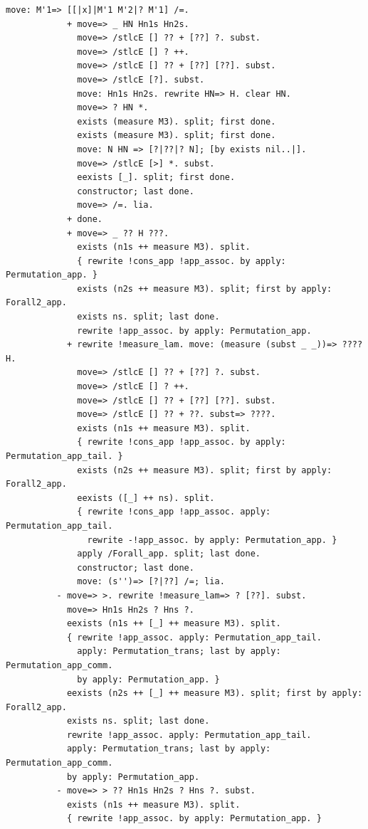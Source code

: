 \begin{lstlisting}[style=authorcoq]
            move: M'1=> [[|x]|M'1 M'2|? M'1] /=.
            + move=> _ HN Hn1s Hn2s.
              move=> /stlcE [] ?? + [??] ?. subst.
              move=> /stlcE [] ? ++.
              move=> /stlcE [] ?? + [??] [??]. subst.
              move=> /stlcE [?]. subst.
              move: Hn1s Hn2s. rewrite HN=> H. clear HN.
              move=> ? HN *.
              exists (measure M3). split; first done.
              exists (measure M3). split; first done.
              move: N HN => [?|??|? N]; [by exists nil..|].
              move=> /stlcE [>] *. subst.
              eexists [_]. split; first done.
              constructor; last done.
              move=> /=. lia.
            + done.
            + move=> _ ?? H ???.
              exists (n1s ++ measure M3). split.
              { rewrite !cons_app !app_assoc. by apply: Permutation_app. }
              exists (n2s ++ measure M3). split; first by apply: Forall2_app.
              exists ns. split; last done.
              rewrite !app_assoc. by apply: Permutation_app.
            + rewrite !measure_lam. move: (measure (subst _ _))=> ???? H.
              move=> /stlcE [] ?? + [??] ?. subst.
              move=> /stlcE [] ? ++.
              move=> /stlcE [] ?? + [??] [??]. subst.
              move=> /stlcE [] ?? + ??. subst=> ????.
              exists (n1s ++ measure M3). split.
              { rewrite !cons_app !app_assoc. by apply: Permutation_app_tail. }
              exists (n2s ++ measure M3). split; first by apply: Forall2_app.
              eexists ([_] ++ ns). split.
              { rewrite !cons_app !app_assoc. apply: Permutation_app_tail.
                rewrite -!app_assoc. by apply: Permutation_app. }
              apply /Forall_app. split; last done.
              constructor; last done.
              move: (s'')=> [?|??] /=; lia.
          - move=> >. rewrite !measure_lam=> ? [??]. subst.
            move=> Hn1s Hn2s ? Hns ?.
            eexists (n1s ++ [_] ++ measure M3). split.
            { rewrite !app_assoc. apply: Permutation_app_tail.
              apply: Permutation_trans; last by apply: Permutation_app_comm.
              by apply: Permutation_app. }
            eexists (n2s ++ [_] ++ measure M3). split; first by apply: Forall2_app.
            exists ns. split; last done.
            rewrite !app_assoc. apply: Permutation_app_tail.
            apply: Permutation_trans; last by apply: Permutation_app_comm.
            by apply: Permutation_app.
          - move=> > ?? Hn1s Hn2s ? Hns ?. subst.
            exists (n1s ++ measure M3). split.
            { rewrite !app_assoc. by apply: Permutation_app. }

\end{lstlisting}
